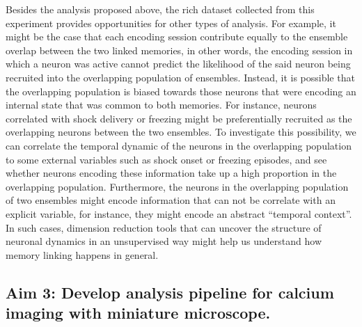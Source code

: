\documentclass[master.tex]{subfiles}
\begin{document}
Besides the analysis proposed above, the rich dataset collected from this
experiment provides opportunities for other types of analysis. For example, it
might be the case that each encoding session contribute equally to the ensemble
overlap between the two linked memories, in other words, the encoding session in
which a neuron was active cannot predict the likelihood of the said neuron being
recruited into the overlapping population of ensembles. Instead, it is possible
that the overlapping population is biased towards those neurons that were
encoding an internal state that was common to both memories. For instance,
neurons correlated with shock delivery or freezing might be preferentially
recruited as the overlapping neurons between the two ensembles. To investigate
this possibility, we can correlate the temporal dynamic of the neurons in the
overlapping population to some external variables such as shock onset or
freezing episodes, and see whether neurons encoding these information take up a
high proportion in the overlapping population. Furthermore, the neurons in the
overlapping population of two ensembles might encode information that can not be
correlate with an explicit variable, for instance, they might encode an abstract
``temporal context''. In such cases, dimension reduction tools that can uncover
the structure of neuronal dynamics in an unsupervised way might help us
understand how memory linking happens in general.

\subsection*{Aim 3: Develop analysis pipeline for calcium imaging with miniature
  microscope.}
\end{document}
